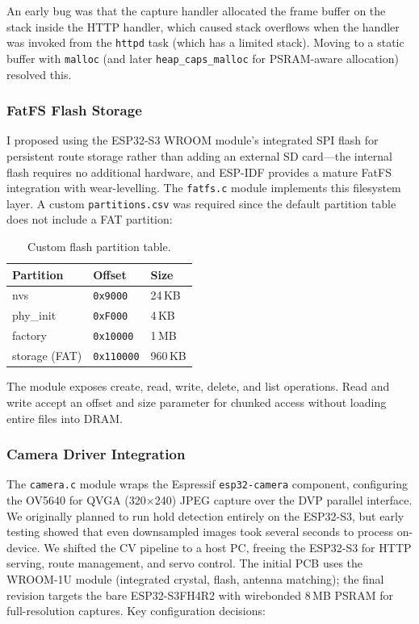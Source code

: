 \documentclass[12pt]{article}
\begin{document}
An early bug was that the capture handler allocated the frame buffer on the
stack inside the HTTP handler, which caused stack overflows when the handler
was invoked from the \texttt{httpd} task (which has a limited stack).  Moving
to a static buffer with \texttt{malloc} (and later \texttt{heap\_caps\_malloc}
for PSRAM-aware allocation) resolved this.

\subsubsection{FatFS Flash Storage}

I proposed using the ESP32-S3 WROOM module's integrated SPI flash for
persistent route storage rather than adding an external SD card---the
internal flash requires no additional hardware, and ESP-IDF provides a
mature FatFS integration with wear-levelling.  The \texttt{fatfs.c} module
implements this filesystem layer.  A custom
\texttt{partitions.csv} was required since the default partition table does
not include a FAT partition:

\begin{table}[H]
  \centering
  \caption{Custom flash partition table.}
  \label{tab:partitions}
  \begin{tabular}{lll}
    \toprule
    Partition & Offset & Size \\
    \midrule
    nvs           & \texttt{0x9000}   & 24\,KB \\
    phy\_init     & \texttt{0xF000}   & 4\,KB \\
    factory       & \texttt{0x10000}  & 1\,MB \\
    storage (FAT) & \texttt{0x110000} & 960\,KB \\
    \bottomrule
  \end{tabular}
\end{table}

The module exposes create, read, write, delete, and list operations.  Read
and write accept an offset and size parameter for chunked access without
loading entire files into DRAM.

\subsubsection{Camera Driver Integration}

The \texttt{camera.c} module wraps the Espressif \texttt{esp32-camera}
component, configuring the OV5640 for QVGA (320$\times$240) JPEG capture
over the DVP parallel interface.  We originally planned to run hold detection
entirely on the ESP32-S3, but early testing showed that even downsampled
images took several seconds to process on-device.  We shifted the CV pipeline
to a host PC, freeing the ESP32-S3 for HTTP serving, route management, and
servo control.  The initial PCB uses the WROOM-1U module (integrated crystal,
flash, antenna matching); the final revision targets the bare ESP32-S3FH4R2
with wirebonded 8\,MB PSRAM for full-resolution captures.  Key configuration
decisions:
\end{document}
